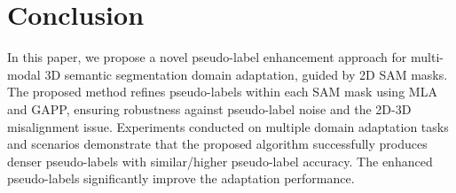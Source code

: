 \section{Conclusion}

In this paper, we propose a novel pseudo-label enhancement approach for multi-modal 3D semantic segmentation domain adaptation, guided by 2D SAM masks. The proposed method refines pseudo-labels within each SAM mask using MLA and GAPP, ensuring robustness against pseudo-label noise and the 2D-3D misalignment issue. Experiments conducted on multiple domain adaptation tasks and scenarios demonstrate that the proposed algorithm successfully produces denser pseudo-labels with similar/higher pseudo-label accuracy. The enhanced pseudo-labels significantly improve the adaptation performance.

